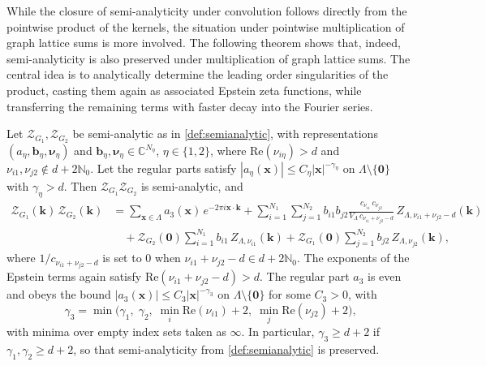 \documentclass[]{amsart}
\numberwithin{mythm}{section}
\begin{document}
While the closure of semi-analyticity under convolution follows directly from the pointwise product of the kernels, the situation under pointwise multiplication of graph lattice sums is more involved.  The following theorem shows that, indeed, semi-analyticity is also preserved under multiplication of graph lattice sums. The central idea is to analytically determine the leading order singularities of the product, casting them again as associated Epstein zeta functions, while transferring the remaining terms with faster decay into the Fourier series. 

\begin{theorem}
\label{thm:multiplication}
Let $\mathcal Z_{G_1},\mathcal Z_{G_2}$ be semi-analytic as in \cref{def:semianalytic}, with representations $(a_\eta,\bm b_\eta,\bm\nu_\eta)$ and $\bm b_\eta,\bm\nu_\eta\in\mathds C^{N_\eta}$, $\eta\in\{1,2\}$, where $\mathrm{Re}(\nu_{i\eta})>d$ and $\nu_{i1},\nu_{j2}\notin d+2\mathds N_0$. Let the regular parts satisfy $|a_\eta(\bm x)|\le C_\eta|\bm x|^{-\gamma_\eta}$ on $\Lambda\setminus\{\bm 0\}$ with $\gamma_\eta>d$. Then $\mathcal Z_{G_1}\mathcal Z_{G_2}$ is semi-analytic, and
\[
\begin{aligned}
\mathcal Z_{G_1}(\bm k)\,\mathcal Z_{G_2}(\bm k)
&=\sum_{\bm x\in\Lambda}a_3(\bm x)\,e^{-2\pi i\bm x\cdot\bm k}+\sum_{i=1}^{N_1}\sum_{j=1}^{N_2} b_{i1}b_{j2}
\frac{c_{\nu_{i1}}\,c_{\nu_{j2}}}{V_\Lambda\,c_{\nu_{i1}+\nu_{j2}-d}}\,
Z_{\Lambda,\nu_{i1}+\nu_{j2}-d}(\bm k)\\
&\quad+\mathcal Z_{G_2}(\bm 0)\sum_{i=1}^{N_1}b_{i1}\,Z_{\Lambda,\nu_{i1}}(\bm k)
+\mathcal Z_{G_1}(\bm 0)\sum_{j=1}^{N_2}b_{j2}\,Z_{\Lambda,\nu_{j2}}(\bm k),
\end{aligned}
\]
where $1/c_{\nu_{i1}+\nu_{j2}-d}$ is set to $0$ when
$\nu_{i1}+\nu_{j2}-d\in d+2\mathds N_0$. The exponents of the Epstein terms again satisfy
$\mathrm{Re}(\nu_{i1}+\nu_{j2}-d)>d$. The regular part $a_3$ is even and obeys the bound
$|a_3(\bm x)|\le C_3|\bm x|^{-\gamma_3}$ on $\Lambda\setminus\{\bm 0\}$ for some
$C_3>0$, with
\[
\gamma_3=\min\Big(\gamma_1,\;\gamma_2,\;\min_{i}\mathrm{Re}(\nu_{i1})+2,\;\min_{j}\mathrm{Re}(\nu_{j2})+2\Big),
\]
with minima over empty index sets taken as $\infty$. In particular, $\gamma_3\ge d+2$ if $\gamma_1,\gamma_2\ge d+2$, so that semi-analyticity from \cref{def:semianalytic} is preserved.
\end{theorem}
\end{document}
